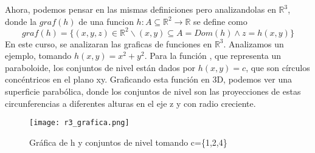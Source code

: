 \documentclass[10pt, a4paper]{report}
\renewcommand{\Re}{\mathbb {R}}
\theoremstyle{definition} %
\begin{document}
Ahora, podemos pensar en las mismas definiciones pero analizandolas en $\Re^{3}$, donde la $graf (h)$ de una funcion $h: A\subseteq\Re^{2}\rightarrow\Re$ se define como
 \[
graf(h)=\{(x,y,z)\in\Re^2 \backslash (x,y)\subseteq A=Dom(h) \land z=h(x,y) \}
 \]
En este curso, se analizaran las graficas de funciones en  $\Re^{3}$. Analizamos un ejemplo, tomando $h(x,y)=x^2+y^2$.
Para la función , que representa un paraboloide, los conjuntos de nivel están dados por $h(x,y)=c$, que son círculos concéntricos en el plano xy. Graficando esta función en 3D, podemos ver una superficie parabólica, donde los conjuntos de nivel son las proyecciones de estas circunferencias a diferentes alturas en el eje z y con radio creciente.
\begin{figure}[h!] %
    \centering
    \texttt{[image: r3\_grafica.png]} %
    \caption{\small{ Gráfica de h y conjuntos de nivel tomando 
    c=\{1,2,4}\}}
    \label{fig:ejemplo} %
\end{figure}
\end{document}
